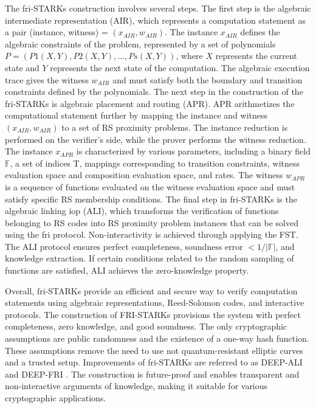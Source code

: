 The \acrshort{fri}-STARKs construction involves several steps. The first step is the algebraic intermediate representation (AIR), which represents a computation statement as a pair (instance, witness) = \((x_{AIR}, w_{AIR})\). The instance \(x_{AIR}\) defines the algebraic constraints of the problem, represented by a set of polynomials \(P = (P1(X, Y), P2(X, Y), ..., Ps(X, Y))\), where \(X\) represents the current state and \(Y\) represents the next state of the computation. The algebraic execution trace gives the witness \(w_{AIR}\) and must satisfy both the boundary and transition constraints defined by the polynomials. The next step in the construction of the \acrshort{fri}-STARKs is algebraic placement and routing (APR). APR arithmetizes the computational statement further by mapping the instance and witness \((x_{AIR}, w_{AIR})\) to a set of RS proximity problems. The instance reduction is performed on the verifier's side, while the prover performs the witness reduction. The instance \(x_{APR}\) is characterized by various parameters, including a binary field \begin{math} \mathbb{F}\end{math}, a set of indices T, mappings corresponding to transition constraints, witness evaluation space and composition evaluation space, and rates. The witness \(w_{APR}\) is a sequence of functions evaluated on the witness evaluation space and must satisfy specific RS membership conditions. The final step in \acrshort{fri}-STARKs is the algebraic linking \acrshort{iop} (ALI), which transforms the verification of functions belonging to RS codes into RS proximity problem instances that can be solved using the \acrshort{fri} protocol. Non-interactivity is achieved through applying the FST. The ALI protocol ensures perfect completeness, soundness error \(< 1/| \)\begin{math} \mathbb{F}\end{math}\(|\), and knowledge extraction. If certain conditions related to the random sampling of functions are satisfied, ALI achieves the zero-knowledge property. 

Overall, \acrshort{fri}-STARKs provide an efficient and secure way to verify computation statements using algebraic representations, Reed-Solomon codes, and interactive protocols. The construction of FRI-STARKs provisions the system with perfect completeness, zero knowledge, and good soundness. The only cryptographic assumptions are public randomness and the existence of a one-way hash function. These assumptions remove the need to use not quantum-resistant elliptic curves and a trusted setup. Improvements of \acrshort{fri}-STARKs are referred to as DEEP-ALI and DEEP-FRI \citep{bensasson2019deepfri}. The construction is future-proof and enables transparent and non-interactive arguments of knowledge, making it suitable for various cryptographic applications.

